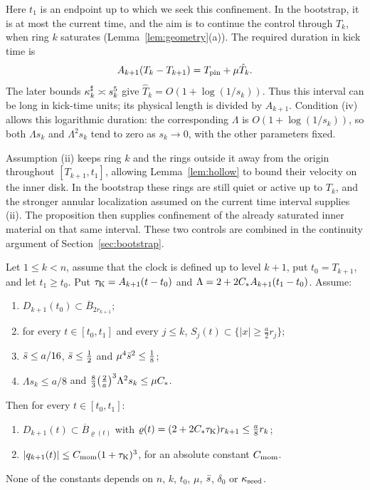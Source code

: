 Here $t_1$ is an endpoint up to which we seek this confinement. In the
bootstrap, it is at most the current time, and the aim is to continue the
control through $T_k$, when ring $k$ saturates
(Lemma~\ref{lem:geometry}\textup{(a)}). The required duration in kick time is
\[
A_{k+1}(T_k-T_{k+1})=T_{\mathrm{pin}}+\mu\hat T_k.
\]
The later bounds $\kappa^\sharp_k\asymp s_k^5$ give
$\hat T_k=O(1+\log(1/s_k))$. Thus this interval can be long in kick-time
units; its physical length is divided by $A_{k+1}$. Condition \textup{(iv)}
allows this logarithmic duration: the corresponding $\Lambda$ is
$O(1+\log(1/s_k))$, so both $\Lambda s_k$ and $\Lambda^2s_k$ tend to zero as
$s_k\to0$, with the other parameters fixed.

Assumption \textup{(ii)} keeps ring $k$ and the rings outside it away from
the origin throughout $[T_{k+1},t_1]$, allowing Lemma~\ref{lem:hollow} to
bound their velocity on the inner disk. In the bootstrap these rings are
still quiet or active up to $T_k$, and the stronger annular localization
assumed on the current time interval supplies \textup{(ii)}. The proposition
then supplies confinement of the already saturated inner material on that
same interval. These two controls are combined in the continuity argument
of Section~\ref{sec:bootstrap}.

\begin{proposition}
\label{prop:confine}
Let $1\le k<n$, assume that the clock is defined up to level $k+1$, put
$t_0=T_{k+1}$, and let $t_1\ge t_0$. Put $\tau_{\mathrm{K}}=A_{k+1}(t-t_0)$ and
$\Lambda=2+2C_{*} A_{k+1}(t_1-t_0)$. Assume:
\begin{enumerate}[label=\textup{(\roman*)}]
\item $D_{k+1}(t_0)\subset\overline{B}_{2r_{k+1}}$;
\item for every $t\in[t_0,t_1]$ and every $j\le k$,
  $S_j(t)\subset\{|x|\ge\frac a2r_j\}$;
\item $\bar s\le a/16$, $\bar s\le\frac12$ and $\mu^4\bar s^2\le\frac18$;
\item $\Lambda s_k\le a/8$ and
  $\frac83\big(\frac2a\big)^3\Lambda^2s_k\le\mu C_{*}$.
\end{enumerate}
Then for every $t\in[t_0,t_1]$:
\begin{enumerate}[label=\textup{(\alph*)}]
\item $D_{k+1}(t)\subset\overline{B}_{\varrho(t)}$ with
  $\varrho(t)=(2+2C_{*}\tau_{\mathrm{K}})r_{k+1}\le\frac a8r_k$;
\item $|q_{k+1}(t)|\le C_{\mathrm{mom}}(1+\tau_{\mathrm{K}})^3$, for an absolute constant $C_{\mathrm{mom}}$.
\end{enumerate}
None of the constants depends on $n$, $k$, $t_0$, $\mu$, $\bar s$, $\delta_0$ or
$\kappa_{\mathrm{seed}}$.
\end{proposition}


